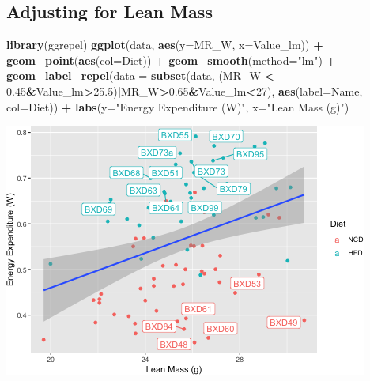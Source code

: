 \documentclass[]{article}
\newenvironment{Shaded}{\begin{snugshade}}{\end{snugshade}}
\newcommand{\CommentTok}[1]{\textcolor[rgb]{0.56,0.35,0.01}{\textit{#1}}}
\newcommand{\DataTypeTok}[1]{\textcolor[rgb]{0.13,0.29,0.53}{#1}}
\newcommand{\DecValTok}[1]{\textcolor[rgb]{0.00,0.00,0.81}{#1}}
\newcommand{\FloatTok}[1]{\textcolor[rgb]{0.00,0.00,0.81}{#1}}
\newcommand{\KeywordTok}[1]{\textcolor[rgb]{0.13,0.29,0.53}{\textbf{#1}}}
\newcommand{\NormalTok}[1]{#1}
\newcommand{\OperatorTok}[1]{\textcolor[rgb]{0.81,0.36,0.00}{\textbf{#1}}}
\newcommand{\StringTok}[1]{\textcolor[rgb]{0.31,0.60,0.02}{#1}}
\begin{document}
\begin{Shaded}
\end{Shaded}

\hypertarget{adjusting-for-lean-mass}{%
\subsection{Adjusting for Lean Mass}\label{adjusting-for-lean-mass}}

\begin{Shaded}
\begin{Highlighting}[]
\KeywordTok{library}\NormalTok{(ggrepel)}
\KeywordTok{ggplot}\NormalTok{(data, }\KeywordTok{aes}\NormalTok{(}\DataTypeTok{y=}\NormalTok{MR_W,}
           \DataTypeTok{x=}\NormalTok{Value_lm)) }\OperatorTok{+}
\StringTok{  }\KeywordTok{geom_point}\NormalTok{(}\KeywordTok{aes}\NormalTok{(}\DataTypeTok{col=}\NormalTok{Diet)) }\OperatorTok{+}
\StringTok{  }\KeywordTok{geom_smooth}\NormalTok{(}\DataTypeTok{method=}\StringTok{"lm"}\NormalTok{) }\OperatorTok{+}
\StringTok{  }\KeywordTok{geom_label_repel}\NormalTok{(}\DataTypeTok{data =} \KeywordTok{subset}\NormalTok{(data, (MR_W }\OperatorTok{<}\StringTok{ }\FloatTok{0.45}\OperatorTok{&}\NormalTok{Value_lm}\OperatorTok{>}\FloatTok{25.5}\NormalTok{)}\OperatorTok{|}\NormalTok{MR_W}\OperatorTok{>}\FloatTok{0.65}\OperatorTok{&}\NormalTok{Value_lm}\OperatorTok{<}\DecValTok{27}\NormalTok{),}
                   \KeywordTok{aes}\NormalTok{(}\DataTypeTok{label=}\NormalTok{Name,}
                       \DataTypeTok{col=}\NormalTok{Diet)) }\OperatorTok{+}
\StringTok{  }\KeywordTok{labs}\NormalTok{(}\DataTypeTok{y=}\StringTok{"Energy Expenditure (W)"}\NormalTok{,}
       \DataTypeTok{x=}\StringTok{"Lean Mass (g)"}\NormalTok{)}
\end{Highlighting}
\end{Shaded}

\includegraphics{figures/lean-mass-adjusting-1.png}
\end{document}
